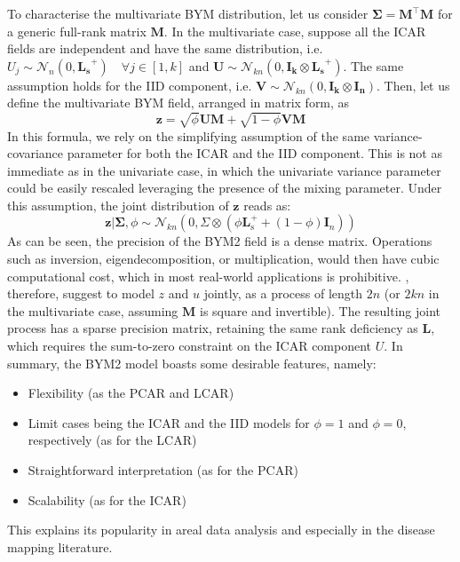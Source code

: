 \documentclass[openany, 11pt, oneside]{book}
\begin{document}
To characterise the multivariate BYM distribution, let us consider $\boldsymbol{\Sigma} = \boldsymbol{M ^\top M}$ for a generic full-rank matrix $\boldsymbol{M}$. In the multivariate case, suppose all the ICAR fields are independent and have the same distribution, i.e. $U_j \sim \mathcal{N}_{n}(0, \boldsymbol{L_{s}}^{+}) \quad \forall j \in [1,k]$ and $\boldsymbol{U} \sim \mathcal{N}_{kn}(0, \boldsymbol{I_k} \otimes \boldsymbol{L_s}^{+})$. The same assumption holds for the IID component, i.e. $\boldsymbol{V} \sim \mathcal{N}_{kn}(0, \boldsymbol{I_k} \otimes \boldsymbol{I_{n}})$. Then, let us define the multivariate BYM field, arranged in matrix form, as
$$
\boldsymbol{z} = \sqrt{\phi}\boldsymbol{UM} + \sqrt{1-\phi}\boldsymbol{VM}
$$
In this formula, we rely on the simplifying assumption of the same variance-covariance parameter for both the ICAR and the IID component. This is not as immediate as in the univariate case, in which the univariate variance parameter could be easily rescaled leveraging the presence of the mixing parameter. Under this assumption, the joint distribution of $\boldsymbol{z}$ reads as:
%
\begin{equation}
\boldsymbol{z}\vert\boldsymbol{\Sigma}, \phi \sim \mathcal{N}_{kn} \left( 0, 
 \Sigma \otimes (\phi \boldsymbol{L}_\mathrm{s}^+ + (1-\phi) \boldsymbol{I}_{n})\right)
 \label{eq:mbym}
\end{equation}
%
As can be seen, the precision of the BYM2 field is a dense matrix. Operations such as inversion, eigendecomposition, or multiplication, would then have cubic computational cost, which in most real-world applications is prohibitive. \cite{BYM2}, therefore, suggest to model $z$ and $u$ jointly, as a process of length $2n$ (or $2kn$ in the multivariate case, assuming $\boldsymbol{M}$ is square and invertible). The resulting joint process has a sparse precision matrix, retaining the same rank deficiency as $\boldsymbol{L}$, which requires the sum-to-zero constraint on the ICAR component $U$. In summary, the BYM2 model boasts some desirable features, namely: 
\begin{itemize}
\item Flexibility (as the PCAR and LCAR) 
\item Limit cases being the ICAR and the IID models for $\phi=1$ and $\phi=0$, respectively (as for the LCAR)
\item Straightforward interpretation (as for the PCAR)
\item Scalability (as for the ICAR)
\end{itemize}
This explains its popularity in areal data analysis and especially in the disease mapping literature. 
\end{document}
